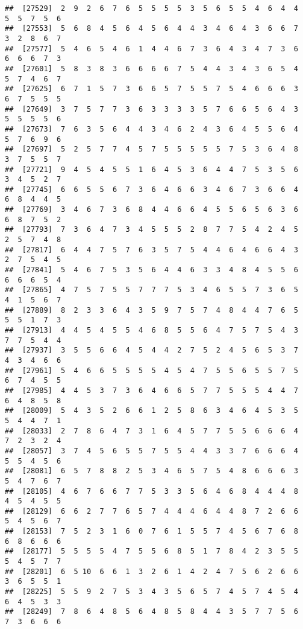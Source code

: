 \documentclass[
]{book}
\begin{document}
\begin{verbatim}
##  [27529]  2  9  2  6  7  6  5  5  5  5  3  5  6  5  5  4  6  4  4  5  5  7  5  6
##  [27553]  5  6  8  4  5  6  4  5  6  4  4  3  4  6  4  3  6  6  7  3  2  8  6  7
##  [27577]  5  4  6  5  4  6  1  4  4  6  7  3  6  4  3  4  7  3  6  6  6  6  7  3
##  [27601]  5  8  3  8  3  6  6  6  6  7  5  4  4  3  4  3  6  5  4  5  7  4  6  7
##  [27625]  6  7  1  5  7  3  6  6  5  7  5  5  7  5  4  6  6  6  3  6  7  5  5  5
##  [27649]  3  7  5  7  7  3  6  3  3  3  3  5  7  6  6  5  6  4  3  5  5  5  5  6
##  [27673]  7  6  3  5  6  4  4  3  4  6  2  4  3  6  4  5  5  6  4  5  7  6  9  6
##  [27697]  5  2  5  7  7  4  5  7  5  5  5  5  5  7  5  3  6  4  8  3  7  5  5  7
##  [27721]  9  4  5  4  5  5  1  6  4  5  3  6  4  4  7  5  3  5  6  3  4  5  2  7
##  [27745]  6  6  5  5  6  7  3  6  4  6  6  3  4  6  7  3  6  6  4  6  8  4  4  5
##  [27769]  3  4  6  7  3  6  8  4  4  6  6  4  5  5  6  5  6  3  6  6  8  7  5  2
##  [27793]  7  3  6  4  7  3  4  5  5  5  2  8  7  7  5  4  2  4  5  2  5  7  4  8
##  [27817]  6  4  4  7  5  7  6  3  5  7  5  4  4  6  4  6  6  4  3  2  7  5  4  5
##  [27841]  5  4  6  7  5  3  5  6  4  4  6  3  3  4  8  4  5  5  6  6  6  6  5  4
##  [27865]  4  7  5  7  5  5  7  7  7  5  3  4  6  5  5  7  3  6  5  4  1  5  6  7
##  [27889]  8  2  3  3  6  4  3  5  9  7  5  7  4  8  4  4  7  6  5  5  5  1  7  3
##  [27913]  4  4  5  4  5  5  4  6  8  5  5  6  4  7  5  7  5  4  3  7  7  5  4  4
##  [27937]  3  5  5  6  6  4  5  4  4  2  7  5  2  4  5  6  5  3  7  4  3  4  6  6
##  [27961]  5  4  6  6  5  5  5  5  4  5  4  7  5  5  6  5  5  7  5  6  7  4  5  5
##  [27985]  4  4  5  3  7  3  6  4  6  6  5  7  7  5  5  5  4  4  7  6  4  8  5  8
##  [28009]  5  4  3  5  2  6  6  1  2  5  8  6  3  4  6  4  5  3  5  5  4  4  7  1
##  [28033]  2  7  8  6  4  7  3  1  6  4  5  7  7  5  5  6  6  6  4  7  2  3  2  4
##  [28057]  3  7  4  5  6  5  5  7  5  5  4  4  3  3  7  6  6  6  4  5  5  4  5  6
##  [28081]  6  5  7  8  8  2  5  3  4  6  5  7  5  4  8  6  6  6  3  5  4  7  6  7
##  [28105]  4  6  7  6  6  7  7  5  3  3  5  6  4  6  8  4  4  4  8  4  5  4  5  5
##  [28129]  6  6  2  7  7  6  5  7  4  4  4  6  4  4  8  7  2  6  6  5  4  5  6  7
##  [28153]  7  5  2  3  1  6  0  7  6  1  5  5  7  4  5  6  7  6  8  6  8  6  6  6
##  [28177]  5  5  5  5  4  7  5  5  6  8  5  1  7  8  4  2  3  5  5  5  4  5  7  7
##  [28201]  6  5 10  6  6  1  3  2  6  1  4  2  4  7  5  6  2  6  6  3  6  5  5  1
##  [28225]  5  5  9  2  7  5  3  4  3  5  6  5  7  4  5  7  4  5  4  6  4  5  3  3
##  [28249]  7  8  6  4  8  5  6  4  8  5  8  4  4  3  5  7  7  5  6  7  3  6  6  6

\end{verbatim}
\end{document}
